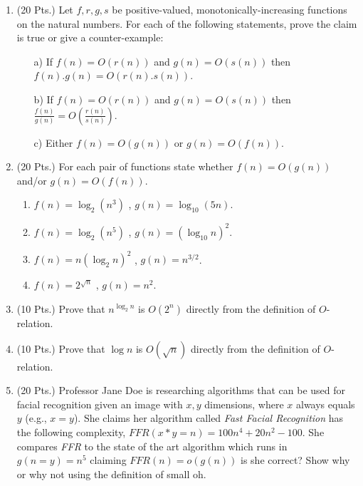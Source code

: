 \begin{enumerate}
\item (20 Pts.) Let    $f,r,g,s$     be    positive-valued,
  monotonically-increasing functions on  the natural numbers. For each
  of  the following  statements, prove  the claim  is true  or  give a
  counter-example:
\begin{itemize}
\item[a)] If $f(n) =O(r(n))$ and $g(n) =O(s(n))$ then $f(n).g(n)
  =O(r(n) .s(n))$.
 \item[b)] If $f(n) =O(r(n))$ and $g(n) =O(s(n))$ then
   ${\frac{f(n)}{g(n)}}=O(  {\frac{r(n)}{s(n)}}  )$. 
 \item[c)] Either $f(n) =O(g(n))$ or $g(n) =O(f(n))$.
\end{itemize}
\item (20 Pts.) For  each pair of functions state  whether $f(n)=O(g(n))$ and/or
  $g(n)=O(f(n))$.
\begin{enumerate}
\item $f(n)=\log_2 (n^3)$ , $g(n)=\log_{10} (5n)$.
\item $f(n)=\log_2 (n^5)$ , $g(n)=(\log_{10} n)^2$.
\item $f(n)=n (\log_2 n)^2$ , $g(n)=n^{3/2}$.
\item $f(n)=2^{\sqrt{n}}$ , $g(n)=n^2$.
\end{enumerate}
\item (10  Pts.) Prove that $n^{\log_2 n}$ is $O(2^n)$ directly from  the definition of $O$-relation.
\item (10  Pts.)  Prove that $\log n$ is $O(\sqrt{n})$ directly from the definition of $O$-relation.
\item (20  Pts.)  Professor Jane Doe is researching algorithms that can be used for facial recognition given an image with $x,y$ dimensions, where $x$ always equals $y$ (e.g., $x = y$).  She claims her algorithm called \emph{Fast Facial Recognition} has the following complexity, $FFR(x*y=n)=100n^4 + 20n^2 -100$.  She compares \emph{FFR} to the state of the art algorithm which runs in $g(n=y)=n^5$ claiming $FFR(n)=o(g(n))$ is she correct? Show why or why not using the definition of small oh.


\end{enumerate}





